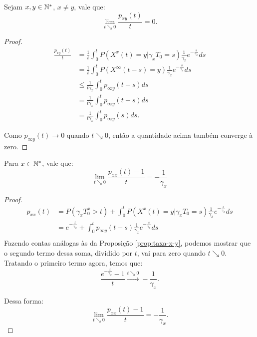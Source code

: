 \begin{proposicao}
  \label{prop:taxa-x-y}
  Sejam $x, y \in {\mathbb{N^*}}$, $x \neq y$, vale que:
  \begin{displaymath}
    \lim_{t \searrow 0} \frac{p_{xy}(t)}{t} = 0.
  \end{displaymath}
\end{proposicao}
\begin{proof}
  \begin{align*}
    \frac{p_{x y} (t)}{t}
    &= \frac{1}{t}\int_{0}^{t} P( X^x(t) = y |
    \gamma_x T_0 = s) \frac{1}{\gamma_x} e^{-\frac{s}{\gamma_x}} ds\\
    &= \frac{1}{t} \int_{0}^{t} P( X^\infty(t-s) = y ) \frac{1}{\gamma_x}
    e^{-\frac{s}{\gamma_x}} ds \\
    &\leq \frac{1}{t \gamma_x} \int_{0}^{t} p_{\infty y}(t-s) ds \\
    &= \frac{1}{t \gamma_x} \int_{0}^{t} p_{\infty y}(t-s) ds \\
    &= \frac{1}{t \gamma_x} \int_{0}^{t} p_{\infty y}(s) ds.
  \end{align*}

  Como $p_{\infty y} (t) \to 0$ quando $t \searrow 0$, então a
  quantidade acima também converge à zero.
\end{proof}

\begin{proposicao}
  \label{prop:taxa-x-x}
  Para $x \in {\mathbb{N^*}}$, vale que:
  \begin{displaymath}
    \lim_{t \searrow 0} \frac{p_{xx}(t) - 1}{t} = -\frac{1}{\gamma_x}
  \end{displaymath}
\end{proposicao}
\begin{proof}
  \begin{align*}
    p_{xx} (t)
    &= P( \gamma_x T_0^x > t) + 
    \int_{0}^{t} P( X^x(t) = y |
    \gamma_x T_0 = s) \frac{1}{\gamma_x} e^{-\frac{s}{\gamma_x}} ds\\
    &= e^{-\frac{t}{\gamma_x}} + 
    \int_{0}^{t} p_{\infty y}(t-s) \frac{1}{\gamma_x} e^{-\frac{s}{\gamma_x}} ds\\
  \end{align*}
  Fazendo contas análogas às da Proposição \ref{prop:taxa-x-y},
  podemos mostrar que o segundo termo dessa soma, dividido por $t$,
  vai para zero quando $t \searrow 0$. Tratando o primeiro termo
  agora, temos que:
  \begin{displaymath}
    \frac{e^{-\frac{t}{\gamma_x}} - 1}{t} \xrightarrow{t \searrow 0}
    -\frac{1}{\gamma_x}.
  \end{displaymath}

  Dessa forma:
  \begin{displaymath}
     \lim_{t \searrow 0} \frac{p_{xx} (t) - 1}{t} = -\frac{1}{\gamma_x}.
  \end{displaymath}
  
\end{proof}

